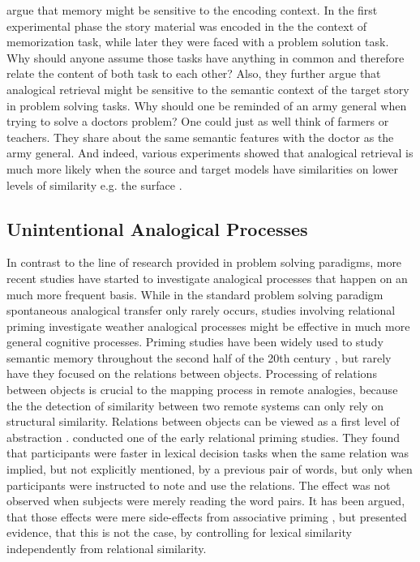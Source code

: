\documentclass[a4paper,man,natbib,floatsintext,import]{apa6}
\begin{document}
\cite{Gick1980} argue that memory might be sensitive to the encoding context. In the first experimental phase the story material was encoded in the the context of memorization task, while later they were faced with a problem solution task. Why should anyone assume those tasks have anything in common and therefore relate the content of both task to each other? Also, they further argue that analogical retrieval might be sensitive to the semantic context of the target story in problem solving tasks. Why should one be reminded of an army general when trying to solve a doctors problem? One could just as well think of farmers or teachers. They share about the same semantic features with the doctor as the army general. And indeed, various experiments showed that analogical retrieval is much more likely when the source and target models have similarities on lower levels of similarity e.g. the surface \citep{Gentner1993,Holyoak1987}.


\subsection{Unintentional Analogical Processes}
In contrast to the line of research provided in problem solving paradigms, more recent studies have started to investigate analogical processes that happen on an much more frequent basis. While in the standard problem solving paradigm spontaneous analogical transfer only rarely occurs, studies involving relational priming investigate weather analogical processes might be effective in much more general cognitive processes. Priming studies have been widely used to study semantic memory throughout the second half of the 20th century \citep{Lucas2000}, but rarely have they focused on the relations between objects. Processing of relations between objects is crucial to the mapping process in remote analogies, because the the detection of similarity between two remote systems can only rely on structural similarity. Relations between objects can be viewed as a first level of abstraction \cite{Catrambone2002}. \cite{Spellman2001} conducted one of the early relational priming studies. They found that participants were faster in lexical decision tasks when the same relation was implied, but not explicitly mentioned, by a previous pair of words, but only when participants were instructed to note and use the relations. The effect was not observed when subjects were merely reading the word pairs. It has been argued, that those effects were mere side-effects from associative priming \citep{Gagne2005}, but \cite{Estes2006} presented evidence, that this is not the case, by controlling for lexical similarity independently from relational similarity.
\end{document}
